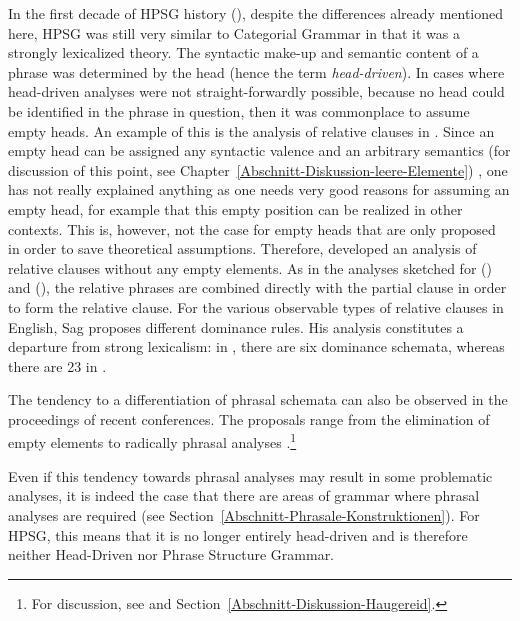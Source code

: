 In the first decade of HPSG history (\citealp*{ps,ps2,NNP94}), despite the differences already mentioned here, HPSG was still very similar to Categorial Grammar
in that it was a strongly lexicalized theory. The syntactic make-up and semantic content of a phrase was determined by the head (hence the term \emph{head-driven}).
In cases where head-driven analyses were not straight-forwardly possible, because no head could be identified in the phrase in question, then it was commonplace to
assume empty heads. An example of this is the analysis of relative clauses in \citet[Chapter~5]{ps2}.
Since an empty head can be assigned any syntactic valence and an arbitrary semantics (for discussion of this point, see Chapter~\ref{Abschnitt-Diskussion-leere-Elemente})
, one has not really explained anything as one needs very good reasons for assuming an empty head, for example that this empty position can be realized in other
contexts. This is, however, not the case for empty heads that are only proposed in order to save theoretical assumptions. Therefore, \citet{Sag97a} developed
an analysis of relative clauses without any empty elements. As in the analyses sketched for () and (), the relative phrases are combined directly
with the partial clause in order to form the relative clause. For the various observable types of relative clauses in English, Sag proposes different dominance rules.
His analysis constitutes a departure from strong lexicalism: in , there are six dominance schemata, whereas there are 23 in . 

The tendency to a differentiation of phrasal schemata can also be observed in the proceedings of
recent conferences. The proposals range from the elimination of empty elements to radically phrasal analyses \citep{Haugereid2007a,Haugereid2009a}.\footnote{
	For discussion, see   and Section~\ref{Abschnitt-Diskussion-Haugereid}.
}

Even if this tendency towards phrasal analyses may result in some problematic analyses, it is indeed the case that there are areas of grammar where
phrasal analyses are required (see Section~\ref{Abschnitt-Phrasale-Konstruktionen}). For HPSG, this
means that it is no longer entirely head-driven and is therefore neither Head-Driven nor Phrase Structure Grammar.

